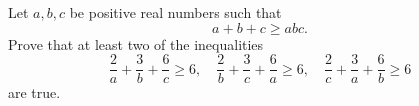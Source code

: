 Let $a,b,c$ be positive real numbers such that \[a+b+c\geq abc.\] Prove that at least two of the inequalities \[\frac{2}{a}+\frac{3}{b}+\frac{6}{c}\geq6,\quad\frac{2}{b}+\frac{3}{c}+\frac{6}{a}\geq6,\quad\frac{2}{c}+\frac{3}{a}+\frac{6}{b}\geq6\] are true.